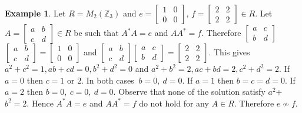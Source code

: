 \documentclass[11pt, one side,emlines]{amsart}
\theoremstyle{definition}
\newtheorem{example}[lemma]{Example}
\numberwithin{equation}{section} \thispagestyle{empty} \voffset
\begin{document}
     \begin{example} Let $R=M_{2}(\mathbb{Z}_{3})$ and $e= 
     \begin{bmatrix}
     	1 & 0\\
     	0 & 0
     \end{bmatrix}$, $f=
     \begin{bmatrix}
     	2 & 2\\
     	2 & 2
     \end{bmatrix} \in R$.
     Let $A=\begin{bmatrix}
     	a & b\\
     	c & d
     \end{bmatrix} \in R$ be such that  $A^*A=e$  and  $AA^*=f$.
     Therefore $\begin{bmatrix}
     	a & c\\
     	b & d
     \end{bmatrix}$
     $\begin{bmatrix}
     	a & b\\
     	c & d
     \end{bmatrix}= \begin{bmatrix}
     	1 & 0\\
     	0 & 0
     \end{bmatrix}$ and $\begin{bmatrix}
     	a & b\\
     	c & d
     \end{bmatrix} \begin{bmatrix}
     	a & c\\
     	b & d
     \end{bmatrix} =\begin{bmatrix}
     	2 & 2\\
     	2 & 2
     \end{bmatrix}$. This gives     
     $a^{2}+c^{2} = 1,ab+cd = 0,b^{2}+d^{2} = 0$ and $a^{2}+b^{2} = 2, ac+bd = 2, c^{2}+d^{2} = 2$.
     If $a=0$ then $c=1$ or $2$. In both cases $~b=0,~d=0$. 
     If $a=1$ then $b=c=d=0$. 
     If $a=2$ then $b=0,~c=0,~d=0$.     
    Observe that none of the solution satisfy $a^{2}$+$b^{2}=2$.
    Hence $A^*A=e$ and  $AA^*=f$ do not hold for any $A \in R$.
    Therefore $ e \nsim f$.
       \end{example}
      	
\end{document}
